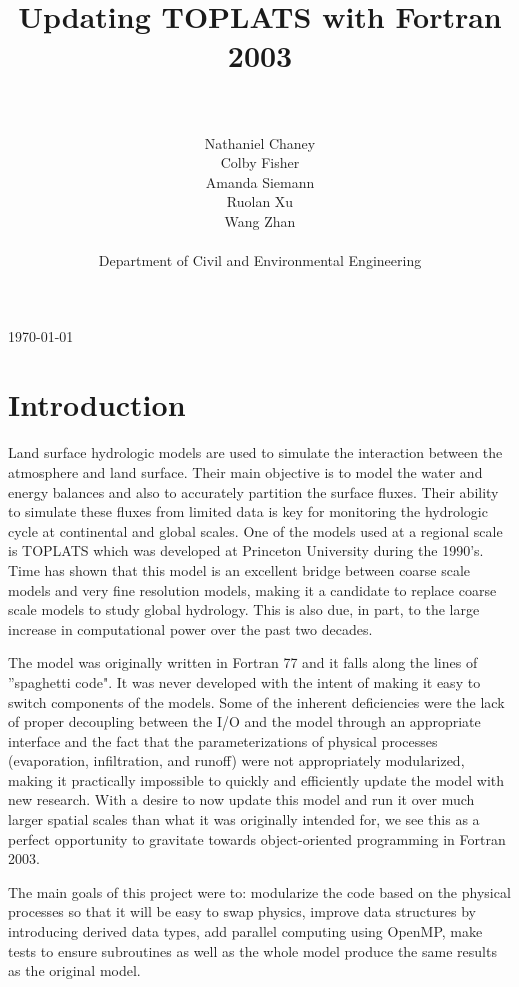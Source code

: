 \documentclass[pdftex,12pt,a4paper]{article}
\title{Updating TOPLATS with Fortran 2003}
\author{\\ \\ Nathaniel Chaney\\ Colby Fisher\\ Amanda Siemann\\ Ruolan Xu\\ Wang Zhan \\ \\ Department of Civil and Environmental Engineering}
\date{}
\begin{document}
\maketitle
\vfill
\begin{center}
{\large \today}
\end{center}

\section{Introduction}
Land surface hydrologic models are used to simulate the interaction between the atmosphere and land surface. Their main objective is to model the water and energy balances and also to accurately partition the surface fluxes. Their ability to simulate these fluxes from limited data is key for monitoring the hydrologic cycle at continental and global scales. One of the models used at a regional scale is TOPLATS which was developed at Princeton University during the 1990's. Time has shown that this model is an excellent bridge between coarse scale models and very fine resolution models, making it a candidate to replace coarse scale models to study global hydrology. This is also due, in part, to the large increase in computational power over the past two decades. 

\vspace{1em}

The model was originally written in Fortran 77 and it falls along the lines of ''spaghetti code". It was never developed with the intent of making it easy to switch components of the models. Some of the inherent deficiencies were the lack of proper decoupling between the I/O and the model through an appropriate interface and the fact that the parameterizations of physical processes (evaporation, infiltration, and runoff) were not appropriately modularized, making it practically impossible to quickly and efficiently update the model with new research. With a desire to now update this model and run it over much larger spatial scales than what it was originally intended for, we see this as a perfect opportunity to gravitate towards object-oriented programming in Fortran 2003. 

\vspace{1em}

The main goals of this project were to: modularize the code based on the physical processes so that it will be easy to swap physics, improve data structures by introducing derived data types, add parallel computing using OpenMP, make tests to ensure subroutines as well as the whole model produce the same results as the original model. 
\end{document}

